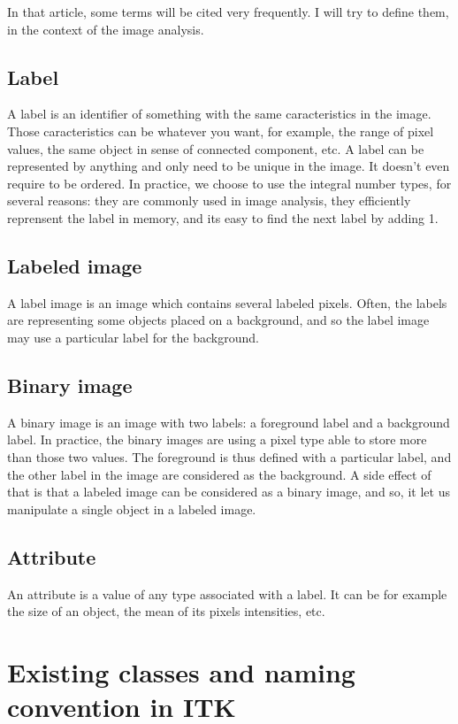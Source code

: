 \documentclass{InsightArticle}
\begin{document}
In that article, some terms will be cited very frequently. I will try to define
them, in the context of the image analysis.

\subsection{Label}

A label is an identifier of something with the same caracteristics in the image.
Those caracteristics can be whatever you want, for example, the range of pixel
values, the same object in sense of connected component, etc.
A label can be represented by anything and only need to be unique in the image.
It doesn't even require to be ordered. In practice, we choose to use the
integral number types, for several reasons: they are commonly used in image
analysis, they efficiently reprensent the label in memory, and its easy to find
the next label by adding 1.

\subsection{Labeled image}

A label image is an image which contains several labeled pixels. Often, the
labels are representing some objects placed on a background, and so the label
image may use a particular label for the background.


\subsection{Binary image}

A binary image is an image with two labels: a foreground label and a background
label. In practice, the binary images are using a pixel type able to store more
than those two values. The foreground is thus defined with a particular label,
and the other label in the image are considered as the background. A side effect
of that is that a labeled image can be considered as a binary image, and so, it
let us manipulate a single object in a labeled image.

\subsection{Attribute}

An attribute is a value of any type associated with a label. It can be for
example the size of an object, the mean of its pixels intensities, etc.

\section{Existing classes and naming convention in ITK}
\end{document}
